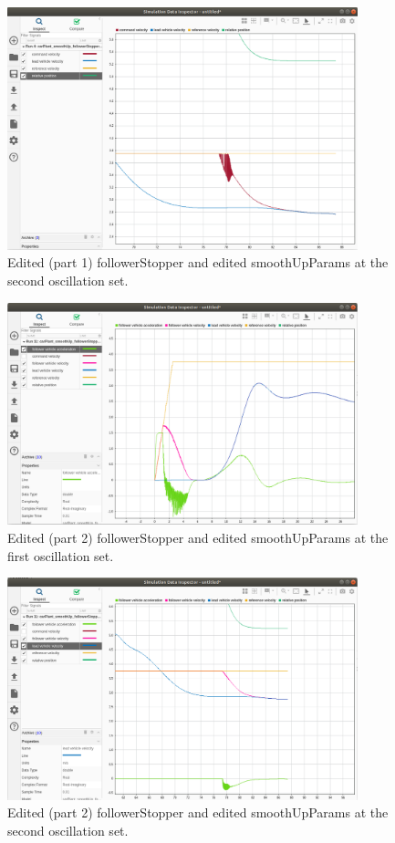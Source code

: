\documentclass[12pt, letterpaper]{article}
\begin{document}
\begin{figure}[h]
\begin{center}
\includegraphics[width=4in]{editedFS_editedSUP_3}
\caption{Edited (part 1) followerStopper and edited smoothUpParams at the second oscillation set.}
\label{default}
\end{center}
\end{figure}

\begin{figure}[h]
\begin{center}
\includegraphics[width=4in]{edited2FS_editedSUP_2}
\caption{Edited (part 2) followerStopper and edited smoothUpParams at the first oscillation set.}
\label{default}
\end{center}
\end{figure}

\begin{figure}[h]
\begin{center}
\includegraphics[width=4in]{edited2FS_editedSUP_3}
\caption{Edited (part 2) followerStopper and edited smoothUpParams at the second oscillation set.}
\label{default}
\end{center}
\end{figure}
\end{document}
